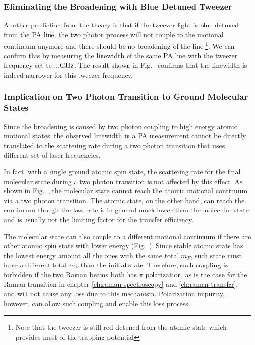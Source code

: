 
\subsubsection{Eliminating the Broadening with Blue Detuned Tweezer}
Another prediction from the theory is that if the tweezer light is blue detuned from
the PA line, the two photon process will not couple to the motional continuum anymore
and there should be no broadening of the line
\footnote{Note that the tweezer is still red detuned from the atomic state which
  provides most of the trapping potential}.
We can confirm this by measuring the linewidth of the same PA line with the tweezer
frequency set to $...\todo{number} \mathrm{GHz}$.
The result shown in Fig.~\todo{\ref{}} confirms that the linewidth is indeed narrower
for this tweezer frequency.


\subsubsection{Implication on Two Photon Transition to Ground Molecular States}
Since the broadening is caused by two photon coupling to high energy atomic motional states,
the observed linewidth in a PA measurement cannot be directly translated to
the scattering rate during a two photon transition that uses different set of laser frequencies.

In fact, with a single ground atomic spin state, the scattering rate for the final molecular
state during a two photon transition is not affected by this effect.
As shown in Fig.~\todo{\ref{}}, the molecular state cannot reach the atomic motional continuum
via a two photon transition.
The atomic state, on the other hand, can reach the continuum though the loss rate is in general
much lower than the molecular state
and is usually not the limiting factor for the transfer efficiency.

The molecular state can also couple to a different motional continuum if there are other
atomic spin state with lower energy (Fig.~\todo{\ref{}}).
Since stable atomic state has the lowest energy amount all the ones with the same total $m_F$,
such state must have a different total $m_F$ than the initial state.
Therefore, such coupling is forbidden if the two Raman beams both has $\pi$ polarization,
as is the case for the Raman transition in chapter \ref{ch:raman-spectroscopy}
and \ref{ch:raman-transfer}, and will not cause any loss due to this mechanism.
Polarization impurity, however, can allow such coupling and enable this loss process.

